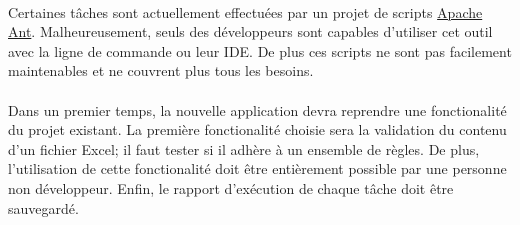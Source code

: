 \paragraph{}
Certaines tâches sont actuellement effectuées par un projet de scripts \href{https://ant.apache.org/}{Apache Ant}.
Malheureusement, seuls des développeurs sont capables d'utiliser cet outil avec la ligne de commande ou leur IDE.
De plus ces scripts ne sont pas facilement maintenables et ne couvrent plus tous les besoins.

\paragraph{}
Dans un premier temps, la nouvelle application devra reprendre une fonctionalité du projet existant.
La première fonctionalité choisie sera la validation du contenu d'un fichier Excel;
il faut tester si il adhère à un ensemble de règles.
De plus, l'utilisation de cette fonctionalité doit être entièrement possible par une personne non développeur.
Enfin, le rapport d'exécution de chaque tâche doit être sauvegardé.